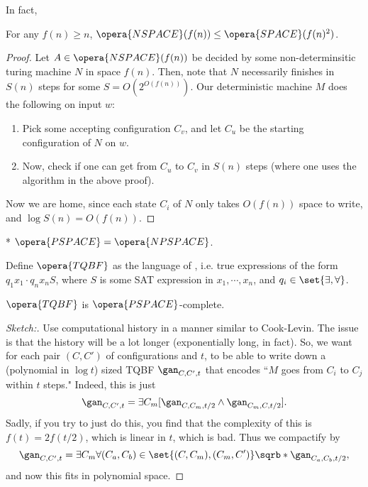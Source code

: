 In fact,

\begin{thm}
	For any $f(n) \geq n$, $\opera{NSPACE}(f(n)) \leq \opera{SPACE}(f(n)^2)$. 
\end{thm}

\begin{proof}
	Let $A\in \opera{NSPACE}(f(n))$ be decided by some non-determinsitic turing machine $N$ in space $f(n)$.
	Then, note that $N$ necessarily finishes in $S(n)$ steps for some $S = O(2^{O(f(n))})$.
	Our deterministic machine $M$ does the following on input $w$:
	\begin{enumerate}
		\item Pick some accepting configuration $C_v$, and let $C_u$ be the starting configuration of $N$ on $w$.
		\item Now, check if one can get from $C_u$ to $C_v$ in $S(n)$ steps (where one uses the algorithm in the above proof).
	\end{enumerate}
	Now we are home, since each state $C_i$ of $N$ only takes $O(f(n))$ space to write, and $\log S(n) = O(f(n))$.
\end{proof}

\begin{cor}*
	$\opera{PSPACE} = \opera{NPSPACE}$.
\end{cor}

\begin{defn}
	Define $\opera{TQBF}$ as the language of , i.e. true expressions of the form $q_1x_1 \cdot q_nx_n S$, where $S$ is some SAT expression in $x_1,\cdots, x_n$, and $q_i \in \set{\exists, \forall}$.
\end{defn}

\begin{thm}
	$\opera{TQBF}$ is $\opera{PSPACE}$-complete.
\end{thm}

\begin{proof}
	[Sketch:] Use computational history in a manner similar to Cook-Levin. The issue is that the history will be a lot longer (exponentially long, in fact).
	So, we want for each pair $(C,C')$ of configurations and $t$, to be able to write down a (polynomial in $\log t$) sized TQBF $\gan_{C,C',t}$ that encodes ``$M$ goes from $C_i$ to $C_j$ within $t$ steps."
	Indeed, this is just \[
		\gan_{C,C',t} = \exists C_m [\gan_{C,C_m, t/2} \land \gan_{C_m, C, t/2}].
	\]
	Sadly, if you try to just do this, you find that the complexity of this is $f(t) = 2f(t/2)$, which is linear in $t$, which is bad.
	Thus we compactify by \[
		\gan_{C,C',t} = \exists C_m \forall (C_a, C_b)\in \set{(C, C_m), (C_m, C')} \sqrb*{\gan_{C_a, C_b, t/2}},
	\]
	and now this fits in polynomial space.
\end{proof}
